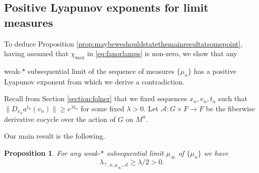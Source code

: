 \documentclass[10pt,reqno]{amsart}
\theoremstyle{Theorem}
\newtheorem{proposition}[theorem]{Proposition}
\theoremstyle{definition}
\theoremstyle{remark}
\renewcommand{\epsilon}{\varepsilon}
\newcommand{\td}{\tilde}
\def\Fib{\mathrm{Fiber}}
\newcommand{\Z}{\mathbb {Z}}
\newcommand{\T}{\mathbb {T}}
\def\calA{\mathcal A}
\def\red{\color{red}}
\def\blue{}
\begin{document}
\subsection{Positive Lyapunov exponents for limit measures}
\label{section:ANLyapunov}
To deduce Proposition \ref{prop:maybeweshouldstatethemainresultatsomepoint}, having assumed that $\chi_{\max}$ in \eqref{eq:fanorlamps} is non-zero, we show that  any {weak-${*}$ subsequential limit of the sequence of measures $\{\mu_n\}$ has a positive Lyapunov exponent from which we derive a contradiction.


Recall from Section \ref{section:folner} that we  fixed sequences $x_n, v_n, t_n$ such  that  $\|D_{x_n}a^{t_n}(v_n)\| \geq e^{ \lambda t_n}$ for some fixed $\lambda > 0$.
Let $\calA\colon G\times F\to F$ be the fiberwise derivative cocycle over the action of $G$ on $M^\alpha$.


Our main result is the following.
\begin{proposition}\label{positiveexponent}
For any weak-$*$ subsequential limit $\mu_\infty$ of $\{\mu_n\}$ we have
$$\lambda_{\top, a, \mu_\infty,\calA}\ge \lambda/2 >0.$$
\end{proposition}


%
%
%
%








}
\end{document}
